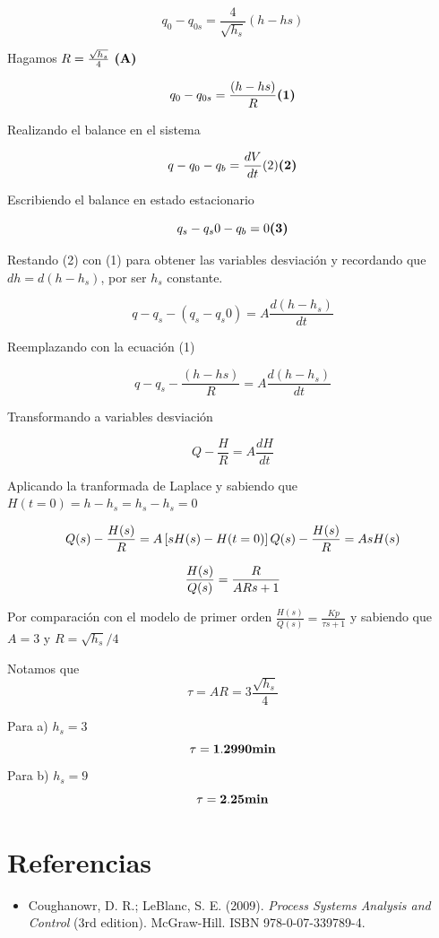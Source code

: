 \documentclass[
  letterpaper,
  DIV=11,
  numbers=noendperiod]{scrreprt}
\providecommand{\tightlist}{%
  \setlength{\itemsep}{0pt}\setlength{\parskip}{0pt}}\usepackage{longtable,booktabs,array}
\begin{document}
\[
q_0-q_{0s}=\frac{4}{\sqrt{h_s}}(h-hs)
\]

Hagamos \(R=\frac{\sqrt{h_s}}{4}\space\space\space\textbf{ (A)}\)

\[
q_0-q_{0s}=\frac{(h-hs)}{R}\space\space\space\space\textbf{(1)}
\]

Realizando el balance en el sistema

\[
q - q_0 - q_b= \frac{dV}{dt} \space\space\space\space (2)\textbf{(2)}
\]

Escribiendo el balance en estado estacionario

\[
q_s- q_s0 -q_b= 0 \space\space\space\space \textbf{(3)}
\]

Restando (2) con (1) para obtener las variables desviación y recordando
que \(dh=d(h-h_s)\), por ser \(h_s\) constante.

\[
q-q_s-(q_s-q_s0)=A\frac{d(h-h_s)}{dt}
\]

Reemplazando con la ecuación (1)

\[
q-q_s-\frac{(h-hs)}{R}=A\frac{d(h-h_s)}{dt}
\]

Transformando a variables desviación

\[
Q - \frac{H}{R} = A\frac{dH}{dt}
\]

Aplicando la tranformada de Laplace y sabiendo que
\(H(t=0)= h-h_s=h_s-h_s=0\)

\[
Q(s) - \frac{H(s)}{R} = A\left[sH(s)-H(t=0)\right]\\
\\
Q(s) - \frac{H(s)}{R} = AsH(s)
\]

\[
\frac{H(s)}{Q(s)}=\frac{R}{ARs+1} \\
\]

Por comparación con el modelo de primer orden
\(\frac{H(s)}{Q(s)}=\frac{Kp}{\tau s+1}\) y sabiendo que \(A=3\) y
\(R = \sqrt{h_s}/4\)

Notamos que \[\tau=AR=3\frac{\sqrt{h_s}}{4}\]

Para a) \(h_s=3\) \[
\mathbf{\tau = 1.2990\space min}
\] Para b) \(h_s=9\) \[
\mathbf{\tau = 2.25 \space min}
\]

\hypertarget{referencias-2}{%
\section{Referencias}\label{referencias-2}}

\begin{itemize}
\tightlist
\item
  Coughanowr, D. R.; LeBlanc, S. E. (2009). \emph{Process Systems
  Analysis and Control} (3rd edition). McGraw-Hill. ISBN
  978-0-07-339789-4.
\end{itemize}
\end{document}
